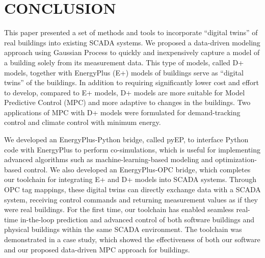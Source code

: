 \section{CONCLUSION}

This paper presented a set of methods and tools to incorporate ``digital twins'' of real buildings into existing SCADA systems.
We proposed a data-driven modeling approach using Gaussian Process to quickly and inexpensively capture a model of a building solely from its measurement data.
This type of models, called D+ models, together with EnergyPlus (E+) models of buildings serve as ``digital twins'' of the buildings.
In addition to requiring significantly lower cost and effort to develop, compared to E+ models, D+ models are more suitable for Model Predictive Control (MPC) and more adaptive to changes in the buildings.
Two applications of MPC with D+ models were formulated for demand-tracking control and climate control with minimum energy.

We developed an EnergyPlus-Python bridge, called pyEP, to interface Python code with EnergyPlus to perform co-simulations, which is useful for implementing advanced algorithms such as machine-learning-based modeling and optimization-based control.
We also developed an EnergyPlus-OPC bridge, which completes our toolchain for integrating E+ and D+ models into SCADA systems.
Through OPC tag mappings, these digital twins can directly exchange data with a SCADA system, receiving control commands and returning measurement values as if they were real buildings.
For the first time, our toolchain has enabled seamless real-time in-the-loop prediction and advanced control of both software buildings and physical buildings within the same SCADA environment.
The toolchain was demonstrated in a case study, which showed the effectiveness of both our software and our proposed data-driven MPC approach for buildings.


